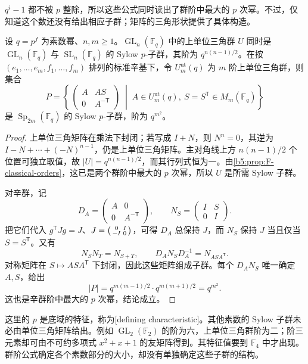 \(q^i-1\) 都不被 \(p\) 整除，所以这些公式同时读出了群阶中最大的 \(p\) 次幂。不过，仅知道这个数还没有给出相应子群；矩阵的三角形状提供了具体构造。

\begin{proposition}\label{b5:prop:F-defining-sylow}
	设 \(q=p^f\) 为素数幂、\(n,m\ge1\)。\(\operatorname{GL}_n(\mathbb F_q)\) 中的上单位三角群 \(U\) 同时是 \(\operatorname{GL}_n(\mathbb F_q)\) 与 \(\operatorname{SL}_n(\mathbb F_q)\) 的 Sylow \(p\)-子群，其阶为 \(q^{n(n-1)/2}\)。在按 \((e_1,\ldots,e_m,f_1,\ldots,f_m)\) 排列的标准辛基下，令 \(U_m^{\mathrm{ut}}(q)\) 为 \(m\) 阶上单位三角群，则集合
	\[
		P=\left\{\,
			\begin{pmatrix}A&AS\\0&A^{-\mathsf T}\end{pmatrix}
			\;\middle|\;
			A\in U_m^{\mathrm{ut}}(q),\ S=S^{\mathsf T}\in M_m(\mathbb F_q)
		\right\}
	\]
	是 \(\operatorname{Sp}_{2m}(\mathbb F_q)\) 的 Sylow \(p\)-子群，阶为 \(q^{m^2}\)。
\end{proposition}
\begin{proof}
	上单位三角矩阵在乘法下封闭；若写成 \(I+N\)，则 \(N^n=0\)，其逆为 \(I-N+\cdots+(-N)^{n-1}\)，仍是上单位三角矩阵。主对角线上方 \(n(n-1)/2\) 个位置可独立取值，故 \(|U|=q^{n(n-1)/2}\)，而其行列式恒为一。由\cref{b5:prop:F-classical-orders}，这已是两个群阶中最大的 \(p\) 次幂，所以 \(U\) 是所需 Sylow 子群。

	对辛群，记
	\[
		D_A=\begin{pmatrix}A&0\\0&A^{-\mathsf T}\end{pmatrix},
		\qquad N_S=\begin{pmatrix}I&S\\0&I\end{pmatrix}.
	\]
	把它们代入 \(g^{\mathsf T}Jg=J\)、\(J=\begin{psmallmatrix}0&I\\-I&0\end{psmallmatrix}\)，可得 \(D_A\) 总保持 \(J\)，而 \(N_S\) 保持 \(J\) 当且仅当 \(S=S^{\mathsf T}\)。又有
	\[
		N_SN_T=N_{S+T},\qquad D_AN_SD_A^{-1}=N_{ASA^{\mathsf T}}.
	\]
	对称矩阵在 \(S\mapsto ASA^{\mathsf T}\) 下封闭，因此这些矩阵组成子群。每个 \(D_AN_S\) 唯一确定 \(A,S\)，给出
	\[
		|P|=q^{m(m-1)/2}\cdot q^{m(m+1)/2}=q^{m^2}.
	\]
	这也是辛群阶中最大的 \(p\) 次幂，结论成立。
\end{proof}

这里的 \(p\) 是底域的特征，称为[defining characteristic]。其他素数的 Sylow 子群未必由单位三角矩阵给出。例如 \(\operatorname{GL}_2(\mathbb F_2)\) 的阶为六，上单位三角群阶为二；阶三元素却可由不可约多项式 \(x^2+x+1\) 的友矩阵得到。其特征值要到 \(\mathbb F_4\) 中才出现。群阶公式确定各个素数部分的大小，却没有单独确定这些子群的结构。


